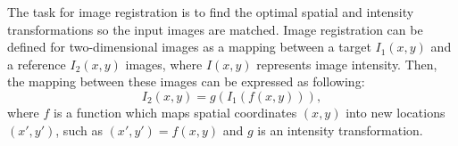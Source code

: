 %  
%  

The task for image registration is to find the optimal  spatial and intensity transformations so the input images are matched. Image registration can be defined for two-dimensional images as a mapping between a target $I_1(x, y)$ and a reference $I_2(x,y)$ images, where $I(x,y)$ represents image intensity. Then, the mapping between these images can be expressed as following:
$$I_2(x,y) = g(I_1(f(x,y))),$$
where $f$ is a function which maps spatial coordinates $(x,y)$ into new locations $(x',y')$, such as $(x', y') = f(x,y)$ and $g$ is an intensity transformation.

